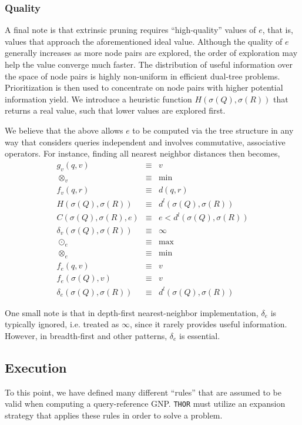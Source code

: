 \documentclass[twoside,leqno,twocolumn]{article}
\newcommand{\THOR}{{{\tt THOR}} }
\newcommand{\summary}{\delta}
\newcommand{\mysubsub}[1]{\subsubsection{#1} }
\newcommand{\lo}[1]{#1^{l}}
\newcommand{\distlo}{\lo{d}}
\newcommand{\dist}[2]{d(#1,#2)}
\newcommand{\nameop}[2]{{\scriptstyle\:}#1_{\!#2}}
\newcommand{\myop}[1]{\nameop{\otimes}{#1}}
\newcommand{\letterqr}{v}
\newcommand{\inqr}{v}
\newcommand{\opqr}{\myop{\letterqr}}
\newcommand{\fqr}{f_{\!\letterqr}}
\newcommand{\gqr}{g_{\!\letterqr}}
\newcommand{\letterqrv}{v}
\newcommand{\deltaqrv}{\summary_{\!\letterqrv}}
\newcommand{\lettermu}{e}
\newcommand{\inmu}{e}
\newcommand{\outopmu}{\:\odot_{\!\lettermu}\:}
\newcommand{\opmu}{\myop{\lettermu}}
\newcommand{\fmu}{f_{\!\lettermu}}
\newcommand{\fmuv}{f_{\!\lettermu}}
\newcommand{\deltamu}{\summary_{\!\lettermu}}
\newcommand{\canprunemu}{C}
\newcommand{\heurqr}{H}
\newcommand{\outstat}{\sigma}
\begin{document}
\mysubsub{Quality}
A final note is that extrinsic pruning requires ``high-quality'' values of $\inmu$, that is, values that approach the aforementioned ideal value.
Although the quality of $\lettermu$ generally increases as more node pairs are explored, the order of exploration may help the value converge much faster.
The distribution of useful information over the space of node pairs is highly non-uniform in efficient dual-tree problems.
Prioritization is then used to concentrate on node pairs with higher potential information yield.
We introduce a heuristic function $\heurqr(\outstat(Q),\outstat(R))$ that returns a real value, such that lower values are explored first.

We believe that the above allows $\lettermu$ to be computed via the tree structure in any way that considers queries independent and involves commutative, associative operators.
For instance, finding all nearest neighbor distances then becomes,
\begin{eqnarray*}
\gqr(q, \inqr) &\equiv& \inqr
\\
\opqr &\equiv& \min
\\
\fqr(q,r) &\equiv& \dist{q}{r}
\\
\heurqr(\outstat(Q),\outstat(R)) &\equiv& \distlo(\outstat(Q), \outstat(R))
\\
\canprunemu(\outstat(Q), \outstat(R), \lettermu)
 &\equiv& \lettermu < \distlo(\outstat(Q), \outstat(R))
\\
\deltaqrv(\outstat(Q),\outstat(R)) &\equiv& \infty
\\
\outopmu &\equiv& \max
\\
\opmu &\equiv& \min
\\
\fmu(q, \letterqr) &\equiv& \letterqr
\\
\fmuv(\outstat(Q), \letterqrv) &\equiv& \letterqrv
\\
\deltamu(\outstat(Q),\outstat(R)) &\equiv& \distlo(\outstat(Q),\outstat(R))
\end{eqnarray*}

\noindent One small note is that in depth-first nearest-neighbor implementation, $\deltamu$ is typically ignored, i.e. treated as $\infty$, since it rarely provides useful information.
However, in breadth-first and other patterns, $\deltamu$ is essential.

\subsection{Execution}

To this point, we have defined many different ``rules'' that are assumed to be valid when computing a query-reference GNP.
\THOR must utilize an expansion strategy that applies these rules in order to solve a problem.
\end{document}
